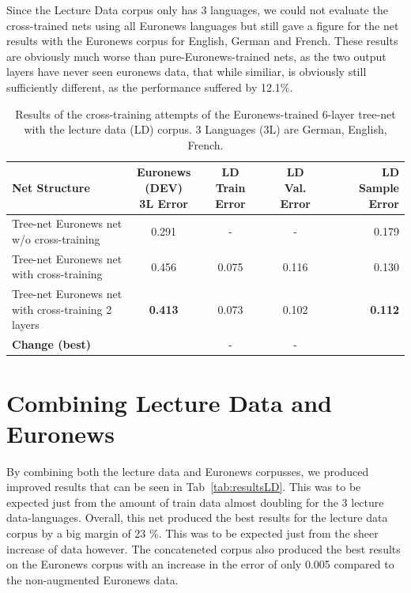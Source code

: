 Since the Lecture Data corpus only has 3 languages, we could not evaluate the cross-trained nets using all Euronews languages but still gave a figure for the net results with the Euronews corpus for English, German and French. These results are obviously much worse than pure-Euronews-trained nets, as the two output layers have never seen euronews data, that while similiar, is obviously still sufficiently different, as the performance suffered by 12.1\%.


\begin{table}
\caption{Results of the cross-training attempts of the Euronews-trained 6-layer tree-net with the lecture data (LD) corpus. 3 Languages (3L) are German, English, French.}
\label{tab:LIDFine}
\begin{tabular}{| l | c | c | c | r | }
	\hline
	\textbf{Net Structure} & \parbox[t]{2cm}{\textbf{Euronews} \\ \textbf{(DEV)} \\ \textbf{3L Error}} &  \parbox[t]{2.3cm}{\textbf{LD} \\ \textbf{Train} \textbf{Error}} &  \parbox[t]{2cm}{\textbf{LD} \\ \textbf{Val. Error}} &  \parbox[t]{2.5cm}{\textbf{LD} \\ \textbf{Sample Error}}  \\
	\hline
	\parbox[t]{4.2cm}{Tree-net Euronews net \\
	 w/o cross-training}  & 0.291 & - & - & 0.179 \\
	\hline
	\parbox[t]{4.2cm}{Tree-net Euronews net \\ with cross-training } & 0.456 & 0.075 & 0.116 & 0.130 \\
	\hdashline
	\parbox[t]{4.2cm}{Tree-net Euronews net \\ with cross-training 2 layers } & \textbf{0.413} & 0.073 & 0.102 & \textbf{0.112} \\
	\hline
	\textbf{Change (best)} &  & - & - &  \\
	\hline
\end{tabular}
\end{table}


\section{Combining Lecture Data and Euronews}
\label{sec:LIDNetworkConcat}
By combining both the lecture data and Euronews corpusses, we produced improved results that can be seen in Tab~\ref{tab:resultsLD}. This was to be expected just from the amount of train data almost doubling for the 3 lecture data-languages. Overall, this net produced the best results for the lecture data corpus by a big margin of 23 \%. This was to be expected just from the sheer increase of data however. The concateneted corpus also produced the best results on the Euronews corpus with an increase in the error of only 0.005 compared to the non-augmented Euronews data. 

